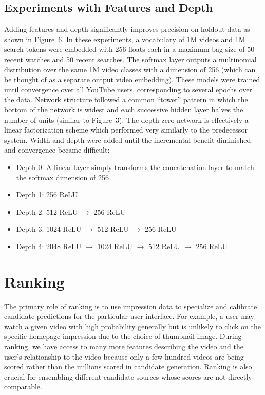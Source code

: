 \subsection{Experiments with Features and Depth}

Adding features and depth significantly improves precision on holdout data
as shown in Figure~6. In these experiments, a vocabulary of 1M videos and 1M
search tokens were embedded with 256 floats each in a maximum bag size of 50
recent watches and 50 recent searches. The softmax layer outputs a
multinomial distribution over the same 1M video classes with a dimension of
256 (which can be thought of as a separate output video embedding). These
models were trained until convergence over all YouTube users, corresponding
to several epochs over the data. Network structure followed a common
``tower'' pattern in which the bottom of the network is widest and each
successive hidden layer halves the number of units (similar to Figure~3).
The depth zero network is effectively a linear factorization scheme which
performed very similarly to the predecessor system. Width and depth were
added until the incremental benefit diminished and convergence became
difficult:

\begin{itemize}
  \item Depth 0: A linear layer simply transforms the concatenation layer to
    match the softmax dimension of 256
  \item Depth 1: 256 ReLU
  \item Depth 2: 512 ReLU $\rightarrow$ 256 ReLU
  \item Depth 3: 1024 ReLU $\rightarrow$ 512 ReLU $\rightarrow$ 256 ReLU
  \item Depth 4: 2048 ReLU $\rightarrow$ 1024 ReLU $\rightarrow$ 512 ReLU
    $\rightarrow$ 256 ReLU
\end{itemize}

\section{Ranking}

The primary role of ranking is to use impression data to specialize and
calibrate candidate predictions for the particular user interface. For
example, a user may watch a given video with high probability generally but
is unlikely to click on the specific homepage impression due to the choice
of thumbnail image. During ranking, we have access to many more features
describing the video and the user's relationship to the video because only a
few hundred videos are being scored rather than the millions scored in
candidate generation. Ranking is also crucial for ensembling different
candidate sources whose scores are not directly comparable.

